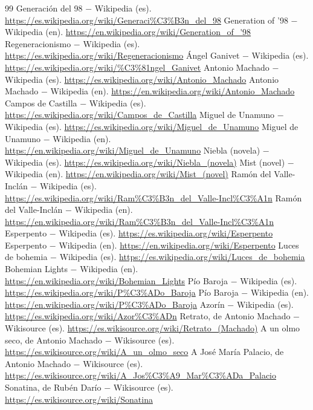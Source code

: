 \documentclass{book}
\begin{document}
\begin{thebibliography}{99}
 Generación del 98 \(-\) Wikipedia (es). \url{https://es.wikipedia.org/wiki/Generaci%C3%B3n_del_98}
 Generation of '98 \(-\) Wikipedia (en). \url{https://en.wikipedia.org/wiki/Generation_of_'98}
 Regeneracionismo \(-\) Wikipedia (es). \url{https://es.wikipedia.org/wiki/Regeneracionismo}
 Ángel Ganivet \(-\) Wikipedia (es). \url{https://es.wikipedia.org/wiki/%C3%81ngel_Ganivet}
 Antonio Machado \(-\) Wikipedia (es). \url{https://es.wikipedia.org/wiki/Antonio_Machado}
 Antonio Machado \(-\) Wikipedia (en). \url{https://en.wikipedia.org/wiki/Antonio_Machado}
 Campos de Castilla \(-\) Wikipedia (es). \url{https://es.wikipedia.org/wiki/Campos_de_Castilla}
 Miguel de Unamuno \(-\) Wikipedia (es). \url{https://es.wikipedia.org/wiki/Miguel_de_Unamuno}
 Miguel de Unamuno \(-\) Wikipedia (en). \url{https://en.wikipedia.org/wiki/Miguel_de_Unamuno}
 Niebla (novela) \(-\) Wikipedia (es). \url{https://es.wikipedia.org/wiki/Niebla_(novela)}
 Mist (novel) \(-\) Wikipedia (en). \url{https://en.wikipedia.org/wiki/Mist_(novel)}
 Ramón del Valle-Inclán \(-\) Wikipedia (es). \url{https://es.wikipedia.org/wiki/Ram%C3%B3n_del_Valle-Incl%C3%A1n}
 Ramón del Valle-Inclán \(-\) Wikipedia (en). \url{https://en.wikipedia.org/wiki/Ram%C3%B3n_del_Valle-Incl%C3%A1n}
 Esperpento \(-\) Wikipedia (es). \url{https://es.wikipedia.org/wiki/Esperpento}
 Esperpento \(-\) Wikipedia (en). \url{https://en.wikipedia.org/wiki/Esperpento}
 Luces de bohemia \(-\) Wikipedia (es). \url{https://es.wikipedia.org/wiki/Luces_de_bohemia}
 Bohemian Lights \(-\) Wikipedia (en). \url{https://en.wikipedia.org/wiki/Bohemian_Lights}
 Pío Baroja \(-\) Wikipedia (es). \url{https://es.wikipedia.org/wiki/P%C3%ADo_Baroja}
 Pío Baroja \(-\) Wikipedia (en). \url{https://en.wikipedia.org/wiki/P%C3%ADo_Baroja}
 Azorín \(-\) Wikipedia (es). \url{https://es.wikipedia.org/wiki/Azor%C3%ADn}
 Retrato, de Antonio Machado \(-\) Wikisource (es). \url{https://es.wikisource.org/wiki/Retrato_(Machado)}
 A un olmo seco, de Antonio Machado \(-\) Wikisource (es). \url{https://es.wikisource.org/wiki/A_un_olmo_seco}
 A José María Palacio, de Antonio Machado \(-\) Wikisource (es). \url{https://es.wikisource.org/wiki/A_Jos%C3%A9_Mar%C3%ADa_Palacio}
 Sonatina, de Rubén Darío \(-\) Wikisource (es). \url{https://es.wikisource.org/wiki/Sonatina}

\end{thebibliography}
\end{document}
